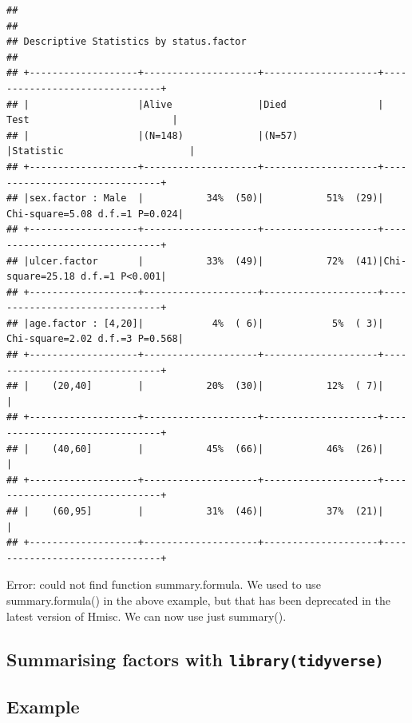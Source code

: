 \documentclass[]{book}
\makeatletter
\newenvironment{kframe}{%
\medskip{}
\setlength{\fboxsep}{.8em}
 \def\at@end@of@kframe{}%
 \ifinner\ifhmode%
  \def\at@end@of@kframe{\end{minipage}}%
  \begin{minipage}{\columnwidth}%
 \fi\fi%
 \def\FrameCommand##1{\hskip\@totalleftmargin \hskip-\fboxsep
 \colorbox{shadecolor}{##1}\hskip-\fboxsep
     \hskip-\linewidth \hskip-\@totalleftmargin \hskip\columnwidth}%
 \MakeFramed {\advance\hsize-\width
   \@totalleftmargin\z@ \linewidth\hsize
   \@setminipage}}%
 {\par\unskip\endMakeFramed%
 \at@end@of@kframe}
\newenvironment{rmdblock}[1]
  {
  \begin{itemize}
  \renewcommand{\labelitemi}{
    \raisebox{-.7\height}[0pt][0pt]{
      {\setkeys{Gin}{width=3em,keepaspectratio}\texttt{[image: images/\#1]}}
    }
  }
  \setlength{\fboxsep}{1em}
  \begin{kframe}
  \item
  }
  {
  \end{kframe}
  \end{itemize}
  }
\newenvironment{error}
  {\begin{rmdblock}{error}}
  {\end{rmdblock}}
\makeatother
\begin{document}
\begin{verbatim}
## 
## 
## Descriptive Statistics by status.factor
## 
## +-------------------+--------------------+--------------------+-------------------------------+
## |                   |Alive               |Died                |  Test                         |
## |                   |(N=148)             |(N=57)              |Statistic                      |
## +-------------------+--------------------+--------------------+-------------------------------+
## |sex.factor : Male  |           34%  (50)|           51%  (29)| Chi-square=5.08 d.f.=1 P=0.024|
## +-------------------+--------------------+--------------------+-------------------------------+
## |ulcer.factor       |           33%  (49)|           72%  (41)|Chi-square=25.18 d.f.=1 P<0.001|
## +-------------------+--------------------+--------------------+-------------------------------+
## |age.factor : [4,20]|            4%  ( 6)|            5%  ( 3)| Chi-square=2.02 d.f.=3 P=0.568|
## +-------------------+--------------------+--------------------+-------------------------------+
## |    (20,40]        |           20%  (30)|           12%  ( 7)|                               |
## +-------------------+--------------------+--------------------+-------------------------------+
## |    (40,60]        |           45%  (66)|           46%  (26)|                               |
## +-------------------+--------------------+--------------------+-------------------------------+
## |    (60,95]        |           31%  (46)|           37%  (21)|                               |
## +-------------------+--------------------+--------------------+-------------------------------+
\end{verbatim}

\begin{error}
Error: could not find function summary.formula. We used to use
summary.formula() in the above example, but that has been deprecated in
the latest version of Hmisc. We can now use just summary().
\end{error}

\subsection{\texorpdfstring{Summarising factors with
\texttt{library(tidyverse)}}{Summarising factors with library(tidyverse)}}\label{summarising-factors-with-librarytidyverse}

\subsection{Example}\label{example}
\end{document}
